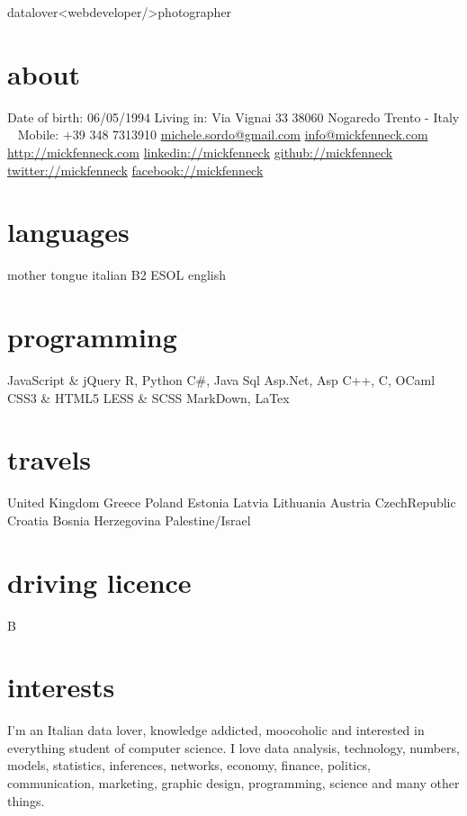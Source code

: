 \documentclass[]{friggeri-cv}
\begin{document}
       {datalover<webdeveloper/>photographer}


\begin{aside}
  \section{about}
    Date of birth:
    06/05/1994
    Living in:
    Via Vignai 33
    38060 Nogaredo
    Trento - Italy
    ~
    Mobile: +39 348 7313910
    \href{mailto:michele.sordo@gmail.com}{michele.sordo@gmail.com}
    \href{mailto:info@mickfenneck.com}{info@mickfenneck.com}
    \href{http://mickfenneck.com}{http://mickfenneck.com}
    \href{http://linkedin.com/in/mickfenneck}{linkedin://mickfenneck}
    \href{http://github.com/mickfenneck}{github://mickfenneck}
    \href{http://twitter.com/mickfenneck}{twitter://mickfenneck}
    \href{http://facebook.com/mickfenneck}{facebook://mickfenneck}
  \section{languages}
    mother tongue italian
    B2 ESOL english
  \section{programming}
    JavaScript \& jQuery
    R, Python
    C\#, Java
    Sql
    Asp.Net, Asp
    C++, C, OCaml
    CSS3 \& HTML5
    LESS \& SCSS
    MarkDown, LaTex
\section{travels}
    United Kingdom
    Greece
    Poland
    Estonia
    Latvia
    Lithuania
    Austria
    CzechRepublic
    Croatia
    Bosnia Herzegovina
    Palestine/Israel
\section{driving licence}
    B
\end{aside}






\section{interests}

I'm an Italian data lover, knowledge addicted, moocoholic and interested in everything student of computer science.
I love data analysis, technology, numbers, models, statistics, inferences, networks, economy, finance, politics, communication, marketing, graphic design, programming, science and many other things.
\end{document}
